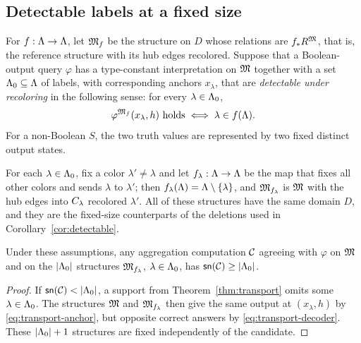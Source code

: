\subsection{Detectable labels at a fixed size}
For $f:\Lambda\to\Lambda$, let $\mathfrak M_f$ be the structure on $D$ whose relations are
$f_\ast R^{\mathfrak M}$, that is, the reference structure with its hub edges
recolored. Suppose that a Boolean-output query $\varphi$ has a
type-constant interpretation on $\mathfrak M$ together with a set $\Lambda_0\subseteq\Lambda$
of labels, with corresponding anchors $x_\lambda$, that are
\emph{detectable under recoloring} in the following sense: for every
$\lambda\in\Lambda_0$,
\begin{equation}\label{eq:transport-decoder}
 \varphi^{\mathfrak M_f}(x_\lambda,h)\ \text{holds}\iff\lambda\in f(\Lambda).
\end{equation}
For a non-Boolean $S$, the two truth values are represented by two fixed
distinct output states.

For each $\lambda\in\Lambda_0$, fix a color $\lambda'\ne\lambda$ and let
$f_\lambda:\Lambda\to\Lambda$ be the map that fixes all other colors and sends
$\lambda$ to $\lambda'$; then $f_\lambda(\Lambda)=\Lambda\setminus\{\lambda\}$,
and $\mathfrak M_{f_\lambda}$ is $\mathfrak M$ with the hub edges into $C_{\lambda}$
recolored $\lambda'$. All of these structures have the same domain $D$, and
they are the fixed-size counterparts of the deletions used in
Corollary~\ref{cor:detectable}.
\begin{proposition}\label{prop:fixed-test}
Under these assumptions, any aggregation computation $\mathcal C$ agreeing with
$\varphi$ on $\mathfrak M$ and on the $|\Lambda_0|$ structures $\mathfrak M_{f_\lambda}$,
$\lambda\in\Lambda_0$, has $\mathsf{sn}(\mathcal C)\ge|\Lambda_0|$.
\end{proposition}
\begin{proof}
If $\wid{\Comp}<|\Det|$, a support from Theorem~\ref{thm:transport} omits
some $\lambda\in\Lambda_0$. The structures $\mathfrak M$ and $\mathfrak M_{f_\lambda}$ then give
the same output at $(x_\lambda,h)$ by \eqref{eq:transport-anchor}, but
opposite correct answers by \eqref{eq:transport-decoder}. These $|\Lambda_0|+1$
structures are fixed independently of the candidate.
\end{proof}

